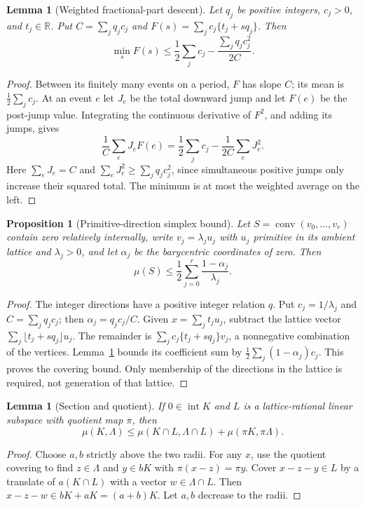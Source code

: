 \documentclass[11pt,a4paper]{article}
\newtheorem{lemma}[theorem]{Lemma}
\newtheorem{proposition}[theorem]{Proposition}
\theoremstyle{remark}\newtheorem{remark}[theorem]{Remark}
\DeclareMathOperator{\conv}{conv}
\newcommand{\R}{\mathbb R}\newcommand{\Z}{\mathbb Z}
\begin{document}
\begin{lemma}[Weighted fractional-part descent]\label{base:flow}
Let $q_j$ be positive integers, $c_j>0$, and $t_j\in\R$. Put
$C=\sum_jq_jc_j$ and $F(s)=\sum_jc_j\{t_j+sq_j\}$. Then
\[
 \min_s F(s)\le
 \frac12\sum_jc_j-\frac{\sum_jq_jc_j^2}{2C}.
\]
\end{lemma}
\begin{proof}
Between its finitely many events on a period, $F$ has slope $C$;
its mean is $\frac12\sum_jc_j$. At an event $e$ let $J_e$ be
the total downward jump and let $F(e)$ be the post-jump value.
Integrating the continuous derivative of $F^2$, and adding its
jumps, gives
\[
 \frac1C\sum_eJ_eF(e)
 =\frac12\sum_jc_j-\frac1{2C}\sum_eJ_e^2.
\]
Here $\sum_eJ_e=C$ and
$\sum_eJ_e^2\ge\sum_jq_jc_j^2$, since simultaneous positive
jumps only increase their squared total. The minimum is at most
the weighted average on the left.
\end{proof}

\begin{proposition}[Primitive-direction simplex bound]\label{base:simplex}
Let $S=\conv(v_0,\ldots,v_r)$ contain zero relatively internally,
write $v_j=\lambda_j u_j$ with $u_j$ primitive in its ambient lattice
and $\lambda_j>0$, and let $\alpha_j$ be the barycentric coordinates
of zero. Then
\[
 \mu(S)\le\frac12\sum_{j=0}^{r}\frac{1-\alpha_j}{\lambda_j}.
\]
\end{proposition}
\begin{proof}
The integer directions have a positive integer relation $q$.
Put $c_j=1/\lambda_j$ and $C=\sum_jq_jc_j$; then
$\alpha_j=q_jc_j/C$. Given $x=\sum_j t_j u_j$, subtract the lattice
vector $\sum_j\lfloor t_j+sq_j\rfloor u_j$. The remainder is
$\sum_jc_j\{t_j+sq_j\}v_j$, a nonnegative combination of the vertices.
Lemma~\ref{base:flow} bounds its coefficient sum by
$\frac12\sum_j(1-\alpha_j)c_j$. This proves the covering bound.
Only membership of the directions in the lattice is required, not
generation of that lattice.
\end{proof}

\begin{lemma}[Section and quotient]\label{base:section}
If $0\in\operatorname{int}K$ and $L$ is a lattice-rational linear
subspace with quotient map $\pi$, then
\[
 \mu(K,\Lambda)\le
 \mu(K\cap L,\Lambda\cap L)+\mu(\pi K,\pi\Lambda).
\]
\end{lemma}
\begin{proof}
Choose $a,b$ strictly above the two radii. For any $x$, use the
quotient covering to find $z\in\Lambda$ and $y\in bK$ with
$\pi(x-z)=\pi y$. Cover $x-z-y\in L$ by a translate of
$a(K\cap L)$ with a vector $w\in\Lambda\cap L$.
Then $x-z-w\in bK+aK=(a+b)K$. Let $a,b$ decrease to the radii.
\end{proof}
\end{document}
